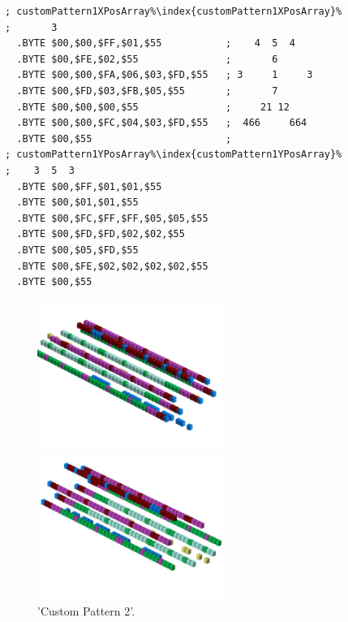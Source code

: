 \begin{minipage}[b]{0.46\linewidth}
\begin{lrbox}{\mybox}%
\begin{lstlisting}[basicstyle=\ttfamily\tiny,escapechar=\%]
; customPattern1XPosArray%\index{customPattern1XPosArray}%             ;       3      
  .BYTE $00,$00,$FF,$01,$55           ;    4  5  4   
  .BYTE $00,$FE,$02,$55               ;       6      
  .BYTE $00,$00,$FA,$06,$03,$FD,$55   ; 3     1     3
  .BYTE $00,$FD,$03,$FB,$05,$55       ;       7      
  .BYTE $00,$00,$00,$55               ;     21 12    
  .BYTE $00,$00,$FC,$04,$03,$FD,$55   ;  466     664 
  .BYTE $00,$55                       ;              
; customPattern1YPosArray%\index{customPattern1YPosArray}%             ;    3  5  3   
  .BYTE $00,$FF,$01,$01,$55
  .BYTE $00,$01,$01,$55
  .BYTE $00,$FC,$FF,$FF,$05,$05,$55
  .BYTE $00,$FD,$FD,$02,$02,$55
  .BYTE $00,$05,$FD,$55
  .BYTE $00,$FE,$02,$02,$02,$02,$55
  .BYTE $00,$55
\end{lstlisting}
\end{lrbox}%
\scalebox{0.8}{\usebox{\mybox}}

\end{minipage}
\begin{minipage}[b]{0.48\linewidth}
\begin{figure}[H]
    \centering
    \begin{adjustbox}{width=6cm,margin=0cm 0cm}
      \includegraphics[width=6cm]{src/patterns/pattern10-45.png}%
    \end{adjustbox}
    \begin{adjustbox}{width=6cm,margin=0cm -2cm}
      \includegraphics[width=6cm]{src/patterns/pattern10-225.png}%
    \end{adjustbox}
\caption{'Custom Pattern 2'.}
\end{figure}
\end{minipage}
